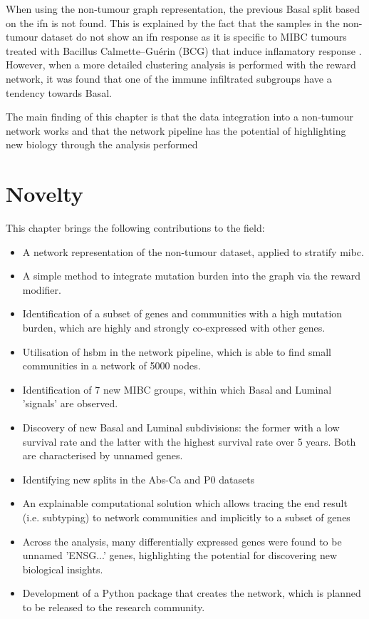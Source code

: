 When using the non-tumour graph representation, the previous Basal split based on the \acrfull{ifn} is not found. This is explained by the fact that the samples in the non-tumour dataset do not show an \acrshort{ifn} response as it is specific to MIBC tumours treated with Bacillus Calmette–Guérin (BCG) that induce inflamatory response \citep{Baker2022-bj}. However, when a more detailed clustering analysis is performed with the reward network, it was found that one of the immune infiltrated subgroups have a tendency towards Basal.

The main finding of this chapter is that the data integration into a non-tumour network works and that the network pipeline has the potential of highlighting new biology through the analysis performed

\newpage

\section{Novelty}

This chapter brings the following contributions to the field:
\begin{itemize}
    \item A network representation of the non-tumour dataset, applied to stratify \acrfull{mibc}.
    \item A simple method to integrate mutation burden into the graph via the reward modifier.
    \item Identification of a subset of genes and communities with a high mutation burden, which are highly and strongly co-expressed with other genes.
    \item Utilisation of \acrfull{hsbm} in the network pipeline, which is able to find small communities in a network of 5000 nodes.
    \item Identification of 7 new MIBC groups, within which Basal and Luminal 'signals' are observed.
    \item Discovery of new Basal and Luminal subdivisions: the former with a low survival rate and the latter with the highest survival rate over 5 years. Both are characterised by unnamed genes.
    \item Identifying new splits in the Abs-Ca and P0 datasets
    \item An explainable computational solution which allows tracing the end result (i.e. subtyping) to network communities and implicitly to a subset of genes
    \item Across the analysis, many differentially expressed genes were found to be unnamed 'ENSG...' genes, highlighting the potential for discovering new biological insights.
    \item Development of a Python package that creates the network, which is planned to be released to the research community.
\end{itemize}


